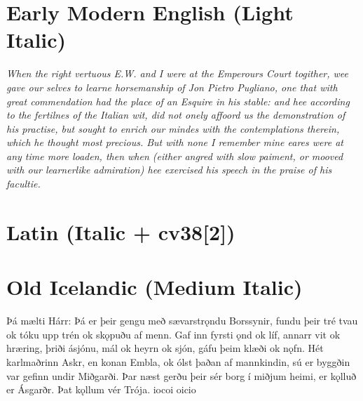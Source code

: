 \documentclass[12pt,letterpaper,openany]{book}
\begin{document}
\section{Early Modern English (Light Italic)}

\textit{\large\itallight{}When the right vertuous E.W. and I were at the Emperours Court to\-gither, wee gave our selves to learne horsemanship of Jon Pietro Pugliano, one that with great commendation had the place of an Esquire in his stable: and hee according to the fertilnes of the Italian wit, did not onely affoord us the demonstration of his practise, but sought to enrich our \mbox{mindes} with the contemplations therein, which he thought most precious. But with none I remember mine eares were at any time more loaden, then when (either angred with slow paiment, or mooved with our learnerlike admiration) hee exercised his speech in the praise of his facultie.}

\section{Latin (Italic + cv38[2])}

\textit{\large{}}

\section{Old Icelandic (Medium Italic)}

{\italmedium\large Þá mælti Hárr: Þá er þeir gengu með sævarstrǫndu Borssynir, fundu þeir tré tvau ok tóku upp trén ok skǫpuðu af menn. Gaf inn fyrsti ǫnd ok líf, annarr vit ok hræring, þriði ásjónu, mál ok heyrn ok sjón, gáfu þeim klæði ok nǫfn. Hét karlmaðrinn Askr, en konan Embla, ok ólst þaðan af mannkindin, sú er byggðin var gefinn undir Miðgarði. Þar næst gerðu þeir sér borg í miðjum heimi, er kǫlluð er Ásgarðr. Þat kǫllum vér Trója. iocoi oicio}
\end{document}

